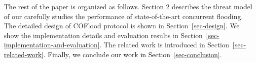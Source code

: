 The rest of the paper is organized as follows. Section 2 describes the threat model of our  carefully studies the performance of state-of-the-art concurrent flooding. The detailed design of COFlood protocol is shown in Section~\ref{sec-design}. We show the implementation details and evaluation results in Section~\ref{sec-implementation-and-evaluation}. The related work is introduced in Section~\ref{sec-related-work}. Finally, we conclude our work in Section~\ref{sec-conclusion}.
